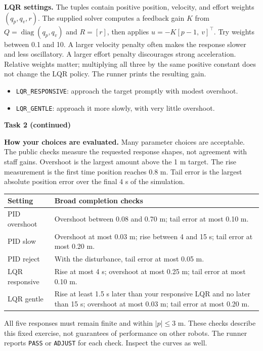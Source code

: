 \documentclass[11pt]{article}
\begin{document}
\textbf{LQR settings.} The tuples contain positive position, velocity,
and effort weights $(q_p,q_v,r)$. The supplied solver computes a feedback
gain $K$ from $Q=\operatorname{diag}(q_p,q_v)$ and $R=[r]$, then applies
$u=-K[p-1,\ v]^\top$. Try weights between 0.1 and 10. A larger velocity
penalty often makes the response slower and less oscillatory. A larger
effort penalty discourages strong acceleration. Relative weights matter;
multiplying all three by the same positive constant does not change the
LQR policy. The runner prints the resulting gain.
\begin{itemize}
\item \texttt{LQR\_RESPONSIVE}: approach the target promptly with modest
      overshoot.
\item \texttt{LQR\_GENTLE}: approach it more slowly, with very little
      overshoot.
\end{itemize}

\clearpage
\noindent\textbf{Task 2 (continued)}

\textbf{How your choices are evaluated.} Many parameter choices are
acceptable. The public checks measure the requested response shapes,
not agreement with staff gains. Overshoot is the largest amount above
the 1 m target. The rise measurement is the first time position reaches
0.8 m. Tail error is the largest absolute position error over the final
4 s of the simulation.
\begin{center}
\small
\begin{tabular}{p{3.4cm}p{10cm}}
Setting & Broad completion checks\\ \hline
PID overshoot & Overshoot between 0.08 and 0.70 m; tail error at most 0.10 m.\\
PID slow & Overshoot at most 0.03 m; rise between 4 and 15 s; tail error at most 0.20 m.\\
PID reject & With the disturbance, tail error at most 0.05 m.\\
LQR responsive & Rise at most 4 s; overshoot at most 0.25 m; tail error at most 0.10 m.\\
LQR gentle & Rise at least 1.5 s later than your responsive LQR and no later than 15 s; overshoot at most 0.03 m; tail error at most 0.20 m.\\
\end{tabular}
\end{center}
All five responses must remain finite and within $|p|\leq3$ m.
These checks describe this fixed exercise, not guarantees of performance
on other robots. The runner reports \texttt{PASS} or \texttt{ADJUST}
for each check. Inspect the curves as well.
\end{document}
